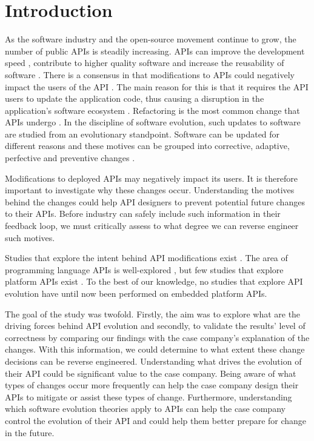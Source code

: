 \documentclass{sig-alternate}
\begin{document}
\section{Introduction} \label{introduction}
As the software industry and the open-source movement continue to grow, the number of public APIs is steadily increasing. APIs can improve the development speed \cite{stylos2006comparing}, contribute to higher quality software \cite{stylos2006comparing} and increase the reusability of software \cite{afonso2012evaluating}. There is a consensus in that modifications to APIs could negatively impact the users of the API \cite{google_talk, mcdonnell2013empirical, robbes2012developers, henning2007api}. The main reason for this is that it requires the API users to update the application code, thus causing a disruption in the application's software ecosystem \cite{messerschmitt2005software}. Refactoring is the most common change that APIs undergo \cite{dig2005role, xing2006refactoring}. 
In the discipline of software evolution, such updates to software are studied from an evolutionary standpoint. Software can be updated for different reasons and these motives can be grouped into corrective, adaptive, perfective and preventive changes \cite{lientz1980software}. 

Modifications to deployed APIs may negatively impact its users. It is therefore important to investigate why these changes occur. Understanding the motives behind the changes could help API designers to  prevent potential future changes to their APIs. Before industry can safely include such information in their feedback loop, we must critically assess to what degree we can reverse engineer such motives. 

Studies that explore the intent behind API modifications exist \cite{hou2011exploring}. The area of programming language APIs is well-explored \cite{hou2011exploring, shi2011empirical}, but few studies that explore platform APIs exist \cite{robbes2012developers}. To the best of our knowledge, no studies that explore API evolution have until now been performed on embedded platform APIs. 

The goal of the study was twofold. Firstly, the aim was to explore what are the driving forces behind API evolution and secondly, to validate the results' level of correctness by comparing our findings with the case company's explanation of the changes. With this information, we could determine to what extent these change decisions can be reverse engineered. 
Understanding what drives the evolution of their API could be significant value to the case company. Being aware of what types of changes occur more frequently can help the case company design their APIs to mitigate or assist these types of change. Furthermore, understanding which software evolution theories apply to APIs can help the case company control the evolution of their API and could help them better prepare for change in the future. 
\end{document}
